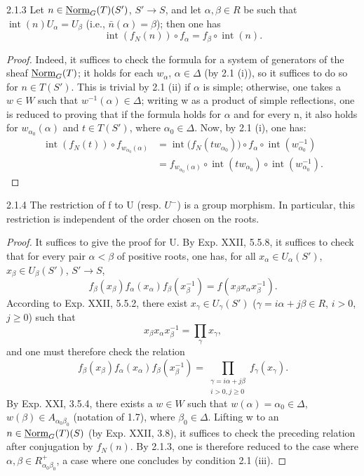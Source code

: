 \begin{lemma}{2.1.3}\label{XXIII.2.1.3}
Let $n\in\underline{\mathrm{Norm}}_G(T)(S')$, $S'\to S$, and let $\alpha,\beta\in R$ be such that $\operatorname{int}(n)U_\alpha=U_\beta$ (i.e., $\bar n(\alpha)=\beta$); then one has
\[
\operatorname{int}(f_N(n))\circ f_\alpha=f_\beta\circ\operatorname{int}(n).
\]
\end{lemma}
\begin{proof}
Indeed, it suffices to check the formula for a system of generators of the sheaf $\underline{\mathrm{Norm}}_G(T)$; it holds for each $w_\alpha$, $\alpha\in\Delta$ (by 2.1 (i)), so it suffices to do so for $n\in T(S')$. This is trivial by 2.1 (ii) if $\alpha$ is simple; otherwise, one takes a $w\in W$ such that $w^{-1}(\alpha)\in\Delta$; writing w as a product of simple reflections, one is reduced to proving that if the formula holds for $\alpha$ and for every n, it also holds for $w_{\alpha_0}(\alpha)$ and $t\in T(S')$, where $\alpha_0\in\Delta$. Now, by 2.1 (i), one has:
\[
\begin{aligned}
\operatorname{int}(f_N(t))\circ f_{w_{\alpha_0}(\alpha)}
&=\operatorname{int}\bigl(f_N(tw_{\alpha_0})\bigr)\circ f_\alpha\circ\operatorname{int}(w_{\alpha_0}^{-1})\\
&=f_{w_{\alpha_0}(\alpha)}\circ\operatorname{int}(tw_{\alpha_0})\circ\operatorname{int}(w_{\alpha_0}^{-1}).
\end{aligned}
\]
\end{proof}
\begin{lemma}{2.1.4}\label{XXIII.2.1.4}
The restriction of f to U (resp. $U^-$) is a group morphism. In particular, this restriction is independent of the order chosen on the roots.
\end{lemma}
\begin{proof}
It suffices to give the proof for U. By Exp. XXII, 5.5.8, it suffices to check that for every pair $\alpha<\beta$ of positive roots, one has, for all $x_\alpha\in U_\alpha(S')$, $x_\beta\in U_\beta(S')$, $S'\to S$,
\[
f_\beta(x_\beta)f_\alpha(x_\alpha)f_\beta(x_\beta^{-1})=f(x_\beta x_\alpha x_\beta^{-1}).
\]
According to Exp. XXII, 5.5.2, there exist $x_\gamma\in U_\gamma(S')$ ($\gamma=i\alpha+j\beta\in R$, $i>0$, $j\geq0$) such that
\[
x_\beta x_\alpha x_\beta^{-1}=\prod_\gamma x_\gamma,
\]
and one must therefore check the relation
\[
f_\beta(x_\beta)f_\alpha(x_\alpha)f_\beta(x_\beta^{-1})
=\prod_{\substack{\gamma=i\alpha+j\beta\\i>0,j\geq0}}f_\gamma(x_\gamma).
\]
By Exp. XXI, 3.5.4, there exists a $w\in W$ such that $w(\alpha)=\alpha_0\in\Delta$, $w(\beta)\in A_{\alpha_0\beta_0}$ (notation of 1.7), where $\beta_0\in\Delta$.
Lifting w to an $n\in\underline{\mathrm{Norm}}_G(T)(S)$ (by Exp. XXII, 3.8), it suffices to check the preceding relation after conjugation by $f_N(n)$. By 2.1.3, one is therefore reduced to the case where $\alpha,\beta\in R^+_{\alpha_0\beta_0}$, a case where one concludes by condition 2.1 (iii).
\end{proof}
